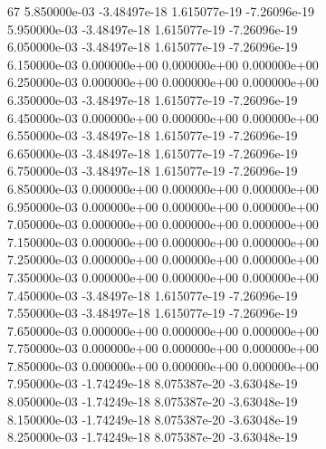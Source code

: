 67	5.850000e-03	-3.48497e-18	1.615077e-19	-7.26096e-19	\\ 	5.950000e-03	-3.48497e-18	1.615077e-19	-7.26096e-19	\\ 	6.050000e-03	-3.48497e-18	1.615077e-19	-7.26096e-19	\\ 	6.150000e-03	0.000000e+00	0.000000e+00	0.000000e+00	\\ 	6.250000e-03	0.000000e+00	0.000000e+00	0.000000e+00	\\ 	6.350000e-03	-3.48497e-18	1.615077e-19	-7.26096e-19	\\ 	6.450000e-03	0.000000e+00	0.000000e+00	0.000000e+00	\\ 	6.550000e-03	-3.48497e-18	1.615077e-19	-7.26096e-19	\\ 	6.650000e-03	-3.48497e-18	1.615077e-19	-7.26096e-19	\\ 	6.750000e-03	-3.48497e-18	1.615077e-19	-7.26096e-19	\\ 	6.850000e-03	0.000000e+00	0.000000e+00	0.000000e+00	\\ 	6.950000e-03	0.000000e+00	0.000000e+00	0.000000e+00	\\ 	7.050000e-03	0.000000e+00	0.000000e+00	0.000000e+00	\\ 	7.150000e-03	0.000000e+00	0.000000e+00	0.000000e+00	\\ 	7.250000e-03	0.000000e+00	0.000000e+00	0.000000e+00	\\ 	7.350000e-03	0.000000e+00	0.000000e+00	0.000000e+00	\\ 	7.450000e-03	-3.48497e-18	1.615077e-19	-7.26096e-19	\\ 	7.550000e-03	-3.48497e-18	1.615077e-19	-7.26096e-19	\\ 	7.650000e-03	0.000000e+00	0.000000e+00	0.000000e+00	\\ 	7.750000e-03	0.000000e+00	0.000000e+00	0.000000e+00	\\ 	7.850000e-03	0.000000e+00	0.000000e+00	0.000000e+00	\\ 	7.950000e-03	-1.74249e-18	8.075387e-20	-3.63048e-19	\\ 	8.050000e-03	-1.74249e-18	8.075387e-20	-3.63048e-19	\\ 	8.150000e-03	-1.74249e-18	8.075387e-20	-3.63048e-19	\\ 	8.250000e-03	-1.74249e-18	8.075387e-20	-3.63048e-19	\\ \hline
